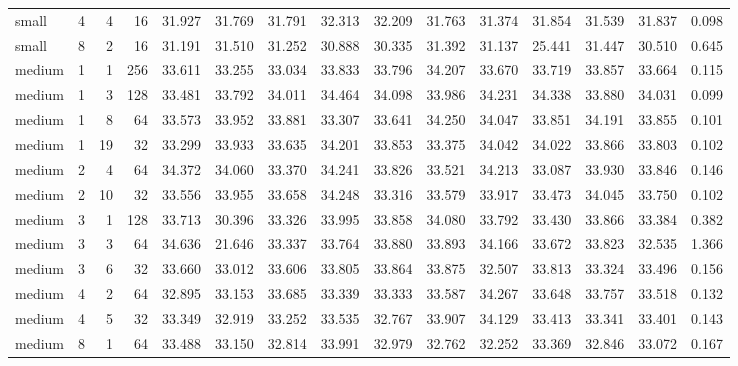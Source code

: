 {\begin{longtable}{@{}lrrrrrrrrrrrrrr@{}}
small & 4 & 4 & 16 & 31.927 & 31.769 & 31.791 & 32.313 & 32.209 & 31.763 & 31.374 & 31.854 & 31.539 & 31.837 & 0.098 \\
small & 8 & 2 & 16 & 31.191 & 31.510 & 31.252 & 30.888 & 30.335 & 31.392 & 31.137 & 25.441 & 31.447 & 30.510 & 0.645 \\
medium & 1 & 1 & 256 & 33.611 & 33.255 & 33.034 & 33.833 & 33.796 & 34.207 & 33.670 & 33.719 & 33.857 & 33.664 & 0.115 \\
medium & 1 & 3 & 128 & 33.481 & 33.792 & 34.011 & 34.464 & 34.098 & 33.986 & 34.231 & 34.338 & 33.880 & 34.031 & 0.099 \\
medium & 1 & 8 & 64 & 33.573 & 33.952 & 33.881 & 33.307 & 33.641 & 34.250 & 34.047 & 33.851 & 34.191 & 33.855 & 0.101 \\
medium & 1 & 19 & 32 & 33.299 & 33.933 & 33.635 & 34.201 & 33.853 & 33.375 & 34.042 & 34.022 & 33.866 & 33.803 & 0.102 \\
medium & 2 & 4 & 64 & 34.372 & 34.060 & 33.370 & 34.241 & 33.826 & 33.521 & 34.213 & 33.087 & 33.930 & 33.846 & 0.146 \\
medium & 2 & 10 & 32 & 33.556 & 33.955 & 33.658 & 34.248 & 33.316 & 33.579 & 33.917 & 33.473 & 34.045 & 33.750 & 0.102 \\
medium & 3 & 1 & 128 & 33.713 & 30.396 & 33.326 & 33.995 & 33.858 & 34.080 & 33.792 & 33.430 & 33.866 & 33.384 & 0.382 \\
medium & 3 & 3 & 64 & 34.636 & 21.646 & 33.337 & 33.764 & 33.880 & 33.893 & 34.166 & 33.672 & 33.823 & 32.535 & 1.366 \\
medium & 3 & 6 & 32 & 33.660 & 33.012 & 33.606 & 33.805 & 33.864 & 33.875 & 32.507 & 33.813 & 33.324 & 33.496 & 0.156 \\
medium & 4 & 2 & 64 & 32.895 & 33.153 & 33.685 & 33.339 & 33.333 & 33.587 & 34.267 & 33.648 & 33.757 & 33.518 & 0.132 \\
medium & 4 & 5 & 32 & 33.349 & 32.919 & 33.252 & 33.535 & 32.767 & 33.907 & 34.129 & 33.413 & 33.341 & 33.401 & 0.143 \\
medium & 8 & 1 & 64 & 33.488 & 33.150 & 32.814 & 33.991 & 32.979 & 32.762 & 32.252 & 33.369 & 32.846 & 33.072 & 0.167 \\
\end{longtable}
}


